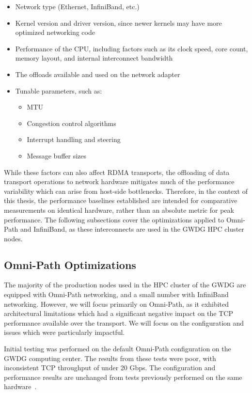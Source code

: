 \begin{itemize}
    \item Network type (Ethernet, InfiniBand, etc.)
    \item Kernel version and driver version, since newer kernels may have more optimized networking code
    \item Performance of the \ac{CPU}, including factors such as its clock speed, core count, memory layout, and internal interconnect bandwidth
    \item The offloads available and used on the network adapter
    \item Tunable parameters, such as:
    \begin{itemize}
        \item \ac{MTU}
        \item Congestion control algorithms
        \item Interrupt handling and steering
        \item Message buffer sizes
    \end{itemize}
\end{itemize}

While these factors can also affect \ac{RDMA} transports, the offloading of data transport operations to network hardware mitigates much of the performance variability which can arise from host-side bottlenecks. Therefore, in the context of this thesis, the performance baselines established are intended for comparative measurements on identical hardware, rather than an absolute metric for peak performance. The following subsections cover the optimizations applied to Omni-Path and InfiniBand, as these interconnects are used in the \ac{GWDG} \ac{HPC} cluster nodes.

\subsection{Omni-Path Optimizations}
\label{sec:opa-optimization}

The majority of the production nodes used in the \ac{HPC} cluster of the \ac{GWDG} are
equipped with Omni-Path networking, and a small number with InfiniBand
networking. However, we will focus primarily on Omni-Path, as it exhibited
architectural limitations which had a significant negative impact on the
\ac{TCP} performance available over the transport. We will focus on
the configuration and issues which were particularly impactful.

Initial testing was performed on the default Omni-Path configuration on the
\ac{GWDG} computing center. The results from these tests were poor, with 
inconsistent \ac{TCP} throughput of under 20 Gbps. The configuration and
performance results are unchanged from tests previously performed on the same
hardware~\cite{using-hpc-networks}. 

